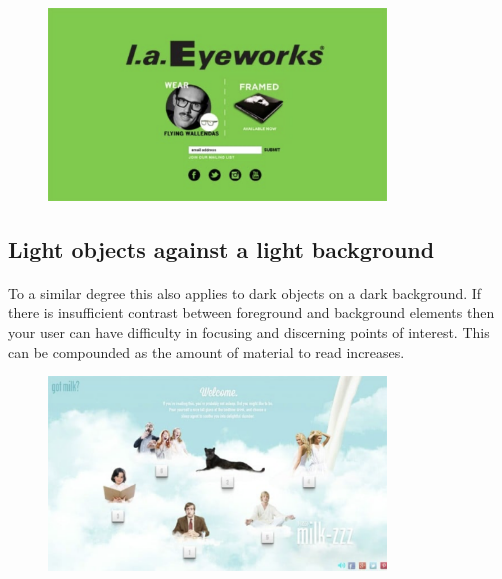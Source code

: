 \begin{figure}[H]
    \centering
    \includegraphics[width=0.8\textwidth]{figures/bad-colours-green-yellow-2}
    \label{fig:bad-colours-green-yellow-2}
    \caption{}
\end{figure}


\subsection{Light objects against a light background}
\paragraph{} To a similar degree this also applies to dark objects on a dark background. If there is insufficient contrast between foreground and background elements then your user can have difficulty in focusing and discerning points of interest. This can be compounded as the amount of material to read increases.


\begin{figure}[H]
    \centering
    \includegraphics[width=0.8\textwidth]{figures/bad-colours-light-background-1}
    \label{fig:bad-colours-light-background-1}
    \caption{}
\end{figure}



